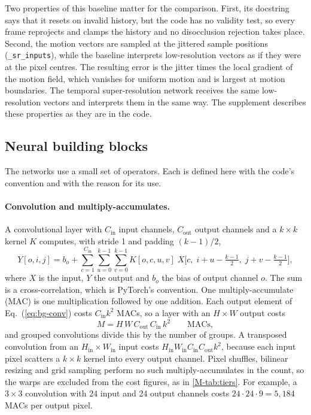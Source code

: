Two properties of this baseline matter for the comparison. First, its docstring says that it resets on invalid history, but the code has no validity test, so every frame reprojects and clamps the history and no disocclusion rejection takes place. Second, the motion vectors are sampled at the jittered sample positions (\texttt{\_sr\_inputs}), while the baseline interprets low-resolution vectors as if they were at the pixel centres. The resulting error is the jitter times the local gradient of the motion field, which vanishes for uniform motion and is largest at motion boundaries. The temporal super-resolution network receives the same low-resolution vectors and interprets them in the same way. The supplement describes these properties as they are in the code.

\subsection{Neural building blocks}\label{sec:bg-cnn}

The networks use a small set of operators. Each is defined here with the code's convention and with the reason for its use.

\paragraph{Convolution and multiply-accumulates.} A convolutional layer with $C_{\text{in}}$ input channels, $C_{\text{out}}$ output channels and a $k\times k$ kernel $K$ computes, with stride 1 and padding $(k-1)/2$,
\begin{equation}
Y[o,i,j]=b_o+\sum_{c=1}^{C_{\text{in}}}\sum_{u=0}^{k-1}\sum_{v=0}^{k-1}K[o,c,u,v]\;X\!\Big[c,\;i+u-\tfrac{k-1}{2},\;j+v-\tfrac{k-1}{2}\Big],\label{eq:bg-conv}
\end{equation}
where $X$ is the input, $Y$ the output and $b_o$ the bias of output channel $o$. The sum is a cross-correlation, which is PyTorch's convention. One multiply-accumulate (MAC) is one multiplication followed by one addition. Each output element of Eq.~(\ref{eq:bg-conv}) costs $C_{\text{in}}k^2$ MACs, so a layer with an $H\times W$ output costs
\begin{equation}
M=H\,W\,C_{\text{out}}\,C_{\text{in}}\,k^2\qquad\text{MACs},\label{eq:bg-macs}
\end{equation}
and grouped convolutions divide this by the number of groups. A transposed convolution from an $H_{\text{in}}\times W_{\text{in}}$ input costs $H_{\text{in}}W_{\text{in}}C_{\text{in}}C_{\text{out}}k^2$, because each input pixel scatters a $k\times k$ kernel into every output channel. Pixel shuffles, bilinear resizing and grid sampling perform no such multiply-accumulates in the count, so the warps are excluded from the cost figures, as in \cref{M-tab:tiers}. For example, a $3\times3$ convolution with 24 input and 24 output channels costs $24\cdot24\cdot9=5{,}184$ MACs per output pixel.

